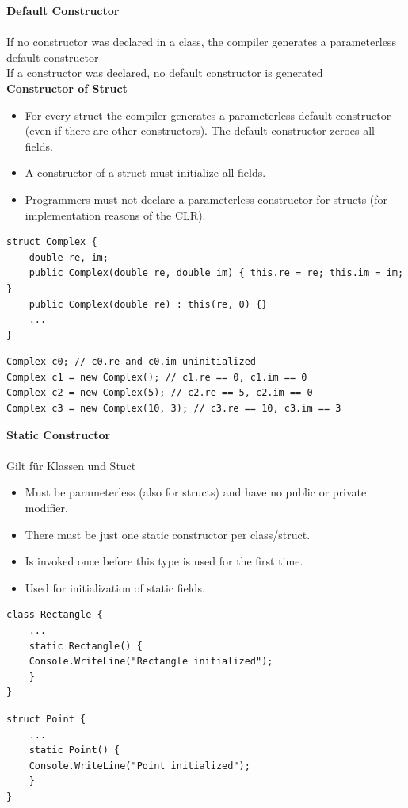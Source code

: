 \textbf{Default Constructor}\\ \\
If no constructor was declared in a class, the compiler generates a parameterless default constructor\\
If a constructor was declared, no default constructor is generated\\ 


\textbf{Constructor of Struct}
\begin{itemize}
	\item For every struct the compiler generates a parameterless default constructor (even if there are other constructors).
		  The default constructor zeroes all fields.
	\item A constructor of a struct must initialize all fields.
	\item Programmers must not declare a parameterless constructor for structs (for implementation reasons of the CLR).
\end{itemize}

\begin{multicols}{2}
\begin{lstlisting}
struct Complex {
	double re, im;
	public Complex(double re, double im) { this.re = re; this.im = im; }
	public Complex(double re) : this(re, 0) {}
	...
}
\end{lstlisting}
\columnbreak
\begin{lstlisting}
Complex c0; // c0.re and c0.im uninitialized
Complex c1 = new Complex(); // c1.re == 0, c1.im == 0
Complex c2 = new Complex(5); // c2.re == 5, c2.im == 0
Complex c3 = new Complex(10, 3); // c3.re == 10, c3.im == 3
\end{lstlisting}
\end{multicols}


\textbf{Static Constructor}\\ \\
Gilt für Klassen und Stuct
\begin{itemize}
	\item Must be parameterless (also for structs) and have no public or private modifier.
	\item There must be just one static constructor per class/struct.
	\item Is invoked once before this type is used for the first time.
	\item Used for initialization of static fields.
\end{itemize}

\begin{multicols}{2}
\begin{lstlisting}
class Rectangle {
	...
	static Rectangle() {
	Console.WriteLine("Rectangle initialized");
	}
}
\end{lstlisting}
\columnbreak
\begin{lstlisting}
struct Point {
	...
	static Point() {
	Console.WriteLine("Point initialized");
	}
}
\end{lstlisting}
\end{multicols}

